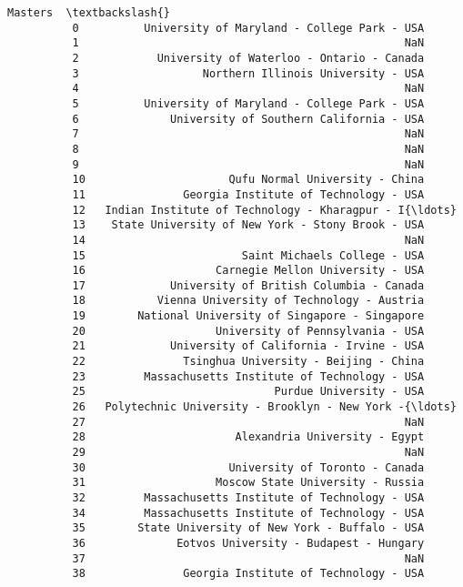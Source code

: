 \documentclass[11pt]{article}
\begin{document}
\begin{Verbatim}[commandchars=\\\{\}]
                                                         Masters  \textbackslash{}
          0          University of Maryland - College Park - USA   
          1                                                  NaN   
          2            University of Waterloo - Ontario - Canada   
          3                   Northern Illinois University - USA   
          4                                                  NaN   
          5          University of Maryland - College Park - USA   
          6              University of Southern California - USA   
          7                                                  NaN   
          8                                                  NaN   
          9                                                  NaN   
          10                      Qufu Normal University - China   
          11               Georgia Institute of Technology - USA   
          12   Indian Institute of Technology - Kharagpur - I{\ldots}   
          13    State University of New York - Stony Brook - USA   
          14                                                 NaN   
          15                        Saint Michaels College - USA   
          16                    Carnegie Mellon University - USA   
          17             University of British Columbia - Canada   
          18           Vienna University of Technology - Austria   
          19        National University of Singapore - Singapore   
          20                    University of Pennsylvania - USA   
          21             University of California - Irvine - USA   
          22               Tsinghua University - Beijing - China   
          23         Massachusetts Institute of Technology - USA   
          25                             Purdue University - USA   
          26   Polytechnic University - Brooklyn - New York -{\ldots}   
          27                                                 NaN   
          28                       Alexandria University - Egypt   
          29                                                 NaN   
          30                      University of Toronto - Canada   
          31                    Moscow State University - Russia   
          32         Massachusetts Institute of Technology - USA   
          34         Massachusetts Institute of Technology - USA   
          35        State University of New York - Buffalo - USA   
          36              Eotvos University - Budapest - Hungary   
          37                                                 NaN   
          38               Georgia Institute of Technology - USA   

\end{Verbatim}
\end{document}
